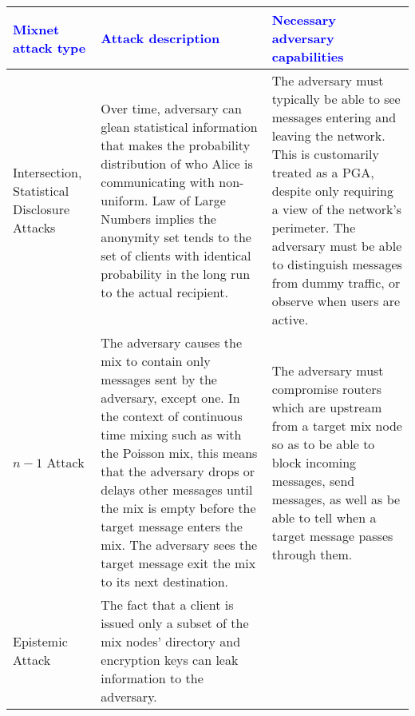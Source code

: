 \documentclass{article}
\begin{document}
\small
\begin{center}
\selectfont
\begin{tabularx}{\textwidth}[t]{|m{}| m{}| m{}| }
\arrayrulecolor{blue}\hline 
\rowcolor{lightBlue} 
\textbf{\textcolor{blue}{Mixnet \linebreak attack type}} & \textbf{\textcolor{blue}{Attack description}} & \textbf{\textcolor{blue}{Necessary adversary capabilities}} \\

\hline Intersection, Statistical Disclosure Attacks & Over time, adversary can glean statistical information that makes the probability distribution of who Alice is communicating with non-uniform. Law of Large Numbers implies the anonymity set tends to the set of clients with identical probability in the long run to the actual recipient. & The adversary must typically be able to see messages entering and leaving the network. This is customarily treated as a PGA, despite only requiring a view of the network's perimeter. The adversary must be able to distinguish messages from dummy traffic, or  observe when users are active.
\\
\hline $n-1$ Attack & The adversary causes the mix to contain only messages sent by the adversary, except one.  In the context of continuous time mixing such as with the Poisson mix, this means that the adversary drops or delays other messages until the mix is empty before the target message enters the mix. The adversary sees the target message exit the mix to its next destination. & The adversary must compromise routers which are upstream from a target mix node so as to be able to block incoming messages, send messages, as well as be able to tell when a target message passes through them.\\

\hline Epistemic Attack & The fact that a client is issued only a subset of the mix nodes' directory and encryption keys can leak information to the adversary.\medskip


\end{tabularx}
\end{center}
\end{document}
